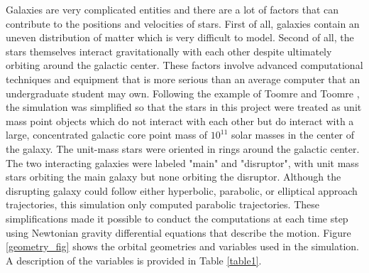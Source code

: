 \documentclass[11pt]{article}
\begin{document}
Galaxies are very complicated entities and there are a lot of factors that can contribute to the positions and velocities of stars.  First of all, galaxies contain an uneven distribution of matter which is very difficult to model.  Second of all, the stars themselves interact gravitationally with each other despite ultimately orbiting around the galactic center.  These factors involve advanced computational techniques and equipment that is more serious than an average computer that an undergraduate student may own.  Following the example of Toomre and Toomre \cite{Toomre1972}, the simulation was simplified so that the stars in this project were treated as unit mass point objects which do not interact with each other but do interact with a large, concentrated galactic core point mass of $10^{11}$ solar masses in the center of the galaxy.  The unit-mass stars were oriented in rings around the galactic center.  The two interacting galaxies were labeled "main" and "disruptor", with unit mass stars orbiting the main galaxy but none orbiting the disruptor.  Although the disrupting galaxy could follow either hyperbolic, parabolic, or elliptical approach trajectories, this simulation only computed parabolic trajectories.  These simplifications made it possible to conduct the computations at each time step using Newtonian gravity differential equations that describe the motion. Figure \ref{geometry_fig} shows the orbital geometries and variables used in the simulation.  A description of the variables is provided in Table \ref{table1}.
\end{document}
